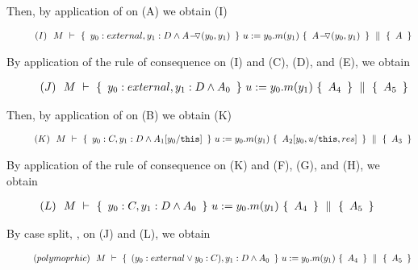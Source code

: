 Then, by application of {}  on (A) we obtain (I)

$
\SPT (I)\ \ {  \hprovesN {M} 
						{ \  y_0:external, y_1: D \wedge  {\PushASLong {(y_0,y_1)} {A}}\ }  
						 { \ u:=y_0.m(y_1)\    }
					         { \   \PushASLong {(y_0,y_1)}{A} \ } 
						{  \ A \ }  }
						\\
						$
						
By application of the rule of consequence on (I) and (C), (D), and (E), we obtain

$
~ \strut \hspace{.9cm} (J)\ \ {  M\ \vdash\ \{\, \  y_0:external, y_1: D \wedge  A_0\ \, \}  \ u:=y_0.m(y_1)\     \{\, \   A_4 \ \, \}\, \,\parallel\,\, \{\,   \ A_5\  \, \}  }
						\\
						$

Then, by application of {}  on (B) we obtain (K)

$
\SPT (K)\ \ {  \hprovesN {M} 
						{ \  y_0:C, y_1: D \wedge  A_1[y_0/\prg{this}]\ }  
						 { \ u:=y_0.m(y_1)\    }
					         { \  A_2[y_0,u/\prg{this},res] \ } 
						{  \ A_3 \ }  }
						\\
						$
						
By application of the rule of consequence on (K) and (F), (G), and (H), we obtain

$
~ \strut \hspace{.9cm} (L)\ \ {  M\ \vdash\ \{\, \  y_0:C, y_1: D \wedge  A_0\ \, \}  \ u:=y_0.m(y_1)\     \{\, \  A_4 \ \, \}\, \,\parallel\,\, \{\,   \ A_5 \  \, \}  }
						\\
						$

By case split, {\sc{[Cases]}}, on (J) and (L), we obtain

$
~ \strut \hspace{.9cm} (polymoprhic)\ \ {  M\ \vdash\ \{\, \  (y_0: external \vee y_0:C), y_1: D \wedge  A_0\ \, \}  \ u:=y_0.m(y_1)\     \{\, \  A_4 \ \, \}\, \,\parallel\,\, \{\,   \ A_5 \  \, \}  }
						\\
						$

